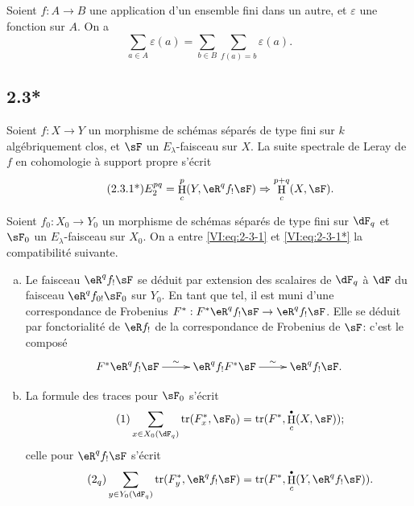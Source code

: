 \documentclass[oneside]{book}
\DeclareMathOperator{\h}{H}
\DeclareMathOperator{\tr}{tr}
\theoremstyle{sga-source}
\theoremstyle{sga-source-dash}
\theoremstyle{sga-source-dotdash}
\theoremstyle{sga-source-number-note-dash}
\theoremstyle{sga-source-note-number-dotdash}
\theoremstyle{sga-source-example-dotdash}
\theoremstyle{sga-source-inline-number}
\theoremstyle{sga-source-bare-number}
\theoremstyle{sga-source}
\let\oldbullet\bullet
\renewcommand{\bullet}{\textnormal{\tiny$\oldbullet$}}
\newcommand{\PrintPage}[1]{}\newcommand{\MathPage}[1]{}\newcommand{\PrintCite}[2]{#1}\newcommand{\var}[3]{#2}
\begin{document}
\subsection{}\label{VI:2-3}

Soient $f:A\to B$ une application d'un ensemble fini dans un autre, et 
$\varepsilon$ une fonction sur $A$. On a 
\begin{equation*}\tag{2.3.1}\label{VI:eq:2-3-1}
  \sum_{a\in A} \varepsilon(a) = \sum_{b\in B} \sum_{f(a)=b} \varepsilon(a) \text{.}
\end{equation*}





\PrintPage{184}
\subsection*{2.3*}\label{VI:2-3*}

Soient $f:X\to Y$ un morphisme de schémas séparés de type fini sur $k$ 
algébriquement clos, et $\sF$ un $E_\lambda$-faisceau sur $X$. La suite 
spectrale de Leray de $f$ en cohomologie à support propre s'écrit 
\begin{align*}\tag{2.3.1*}\label{VI:eq:2-3-1*}
  E_2^{p q} = \h_c^p(Y,\eR^q f_! \sF) \Rightarrow \h_c^{p+q}(X,\sF) \text{.}
\end{align*}

Soient $f_0:X_0 \to Y_0$ un morphisme de schémas séparés de type fini sur 
$\dF_q$ et $\sF_0$ un $E_\lambda$-faisceau sur $X_0$. On a entre 
\eqref{VI:eq:2-3-1} et \eqref{VI:eq:2-3-1*} la compatibilité suivante. 

\begin{enumerate}[a)]
  \item Le faisceau $\eR^q f_! \sF$ se déduit par extension des scalaires de 
    $\dF_q$ à $\dF$ du faisceau $\eR^q f_{0!} \sF_0$ sur $Y_0$. En tant que 
    tel, il est muni d'une correspondance de Frobenius 
    $F^\ast:F^\ast\eR^q f_! \sF \to \eR^q f_! \sF$. Elle se déduit par 
    fonctorialité de $\eR f_!$ de la correspondance de Frobenius de $\sF$: 
    c'est le composé 
    \[\xymatrix{
      F^\ast \eR^q f_! \sF \ar[r]^-\sim 
        & \eR^q f_! F^\ast \sF \ar[r]^-\sim 
        & \eR^q f_! \sF \text{.}
    }\]
  \item La formule des traces pour $\sF_0$ s'écrit 
    \begin{align*}\tag{1}\label{VI:eq:1}
      \sum_{x\in X_0(\dF_q)} \tr(F_x^\ast,\sF_0) = \var{\tr(F^\ast,\h^\bullet(X,\sF))}{\tr(F^\ast,\h_c^\bullet(X,\sF))}{S45-SOL-0736} \text{;}
    \end{align*}
    celle pour $\eR^q f_! \sF$ s'écrit 
    \begin{align*}\tag{2$_q$}\label{VI:eq:2_q} 
      \sum_{y\in Y_0(\dF_q)} \tr(F_y^\ast,\eR^q f_! \sF) = \var{\tr(F^\ast, \h^\bullet(Y,\eR^q f_! \sF))}{\tr(F^\ast,\h_c^\bullet(Y,\eR^q f_! \sF))}{S45-SOL-0737} \text{.}
    \end{align*}
\end{enumerate}
\end{document}
